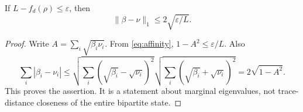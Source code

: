 \begin{corollary}
If $L-f_d(\rho)\le\varepsilon$, then
\begin{equation}\label{eq:highdim-stability}
 \|\beta-\nu\|_1\le2\sqrt{\varepsilon/L}.
\end{equation}
\end{corollary}
\begin{proof}
Write $A=\sum_i\sqrt{\beta_i\nu_i}$. From \eqref{eq:affinity}, $1-A^2\le\varepsilon/L$. Also
\[
 \sum_i|\beta_i-\nu_i|
 \le\sqrt{\sum_i(\sqrt{\beta_i}-\sqrt{\nu_i})^2}
      \sqrt{\sum_i(\sqrt{\beta_i}+\sqrt{\nu_i})^2}
 =2\sqrt{1-A^2}.
\]
This proves the assertion. It is a statement about marginal eigenvalues, not trace-distance closeness of the entire bipartite state.\end{proof}

